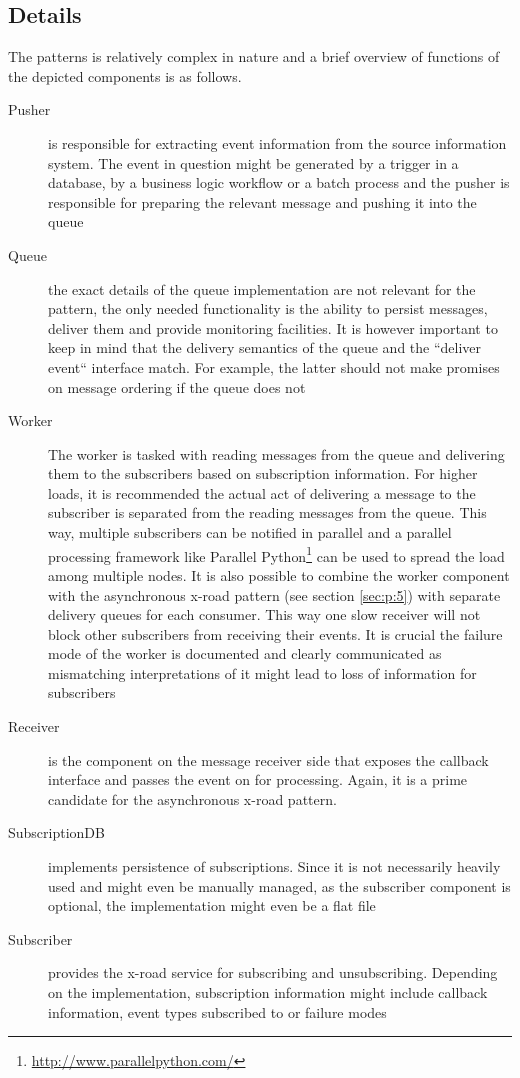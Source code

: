 \documentclass[10pt,a4paper]{article}
\begin{document}
\subsection{Details}
The patterns is relatively complex in nature and a brief overview of functions of the depicted components is as follows.

\begin{description}
	\item[Pusher] is responsible for extracting event information from the source information system. The event in question might be generated by a trigger in a database, by a business logic workflow or a batch process and the pusher is responsible for preparing the relevant message and pushing it into the queue
	\item[Queue] the exact details of the queue implementation are not relevant for the pattern, the only needed functionality is the ability to persist messages, deliver them and provide monitoring facilities. It is however important to keep in mind that the delivery semantics of the queue and the ``deliver event`` interface match. For example, the latter should not make promises on message ordering if the queue does not
	\item[Worker] The worker is tasked with reading messages from the queue and delivering them to the subscribers based on subscription information. For higher loads, it is recommended the actual act of delivering a message to the subscriber is separated from the reading messages from the queue. This way, multiple subscribers can be notified in parallel and a parallel processing framework like Parallel Python\footnote{\url{http://www.parallelpython.com/}} can be used to spread the load among multiple nodes. It is also possible to combine the worker component with the asynchronous x-road pattern (see section \ref{sec:p:5}) with separate delivery queues for each consumer. This way one slow receiver will not block other subscribers from receiving their events. It is crucial the failure mode of the worker is documented and clearly communicated as mismatching interpretations of it might lead to loss of information for subscribers
	\item[Receiver] is the component on the message receiver side that exposes the callback interface and passes the event on for processing. Again, it is a prime candidate for the asynchronous x-road pattern. 
	\item[SubscriptionDB] implements persistence of subscriptions. Since it is not necessarily heavily used and might even be manually managed, as the subscriber component is optional, the implementation might even be a flat file
	\item[Subscriber] provides the x-road service for subscribing and unsubscribing. Depending on the implementation, subscription information might include callback information, event types subscribed to or failure modes	
\end{description}
\end{document}
